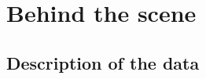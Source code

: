 \chapter{Behind the scene}
\label{chap:behind}
\ifpdf
    \graphicspath{{Chapter7/Figs/Raster/}{Chapter7/Figs/PDF/}{Chapter7/Figs/}}
\else
    \graphicspath{{Chapter7/Figs/Vector/}{Chapter7/Figs/}}
\fi




\section{Description of the data}